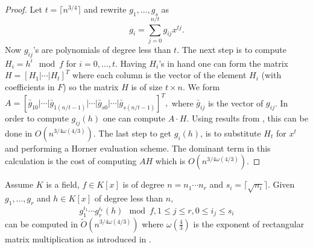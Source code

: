 \documentclass[sigconf]{acmart}
\newcommand{\osumcosttilde}{\tilde{O}(n^{3/4 \omega(4/3)})}
\theoremstyle{acmplain}
\begin{document}
\begin{proof}
Let $t = \lceil n^{3/4} \rceil$ and rewrite $g_1 , \ldots , g_s$ as 
$$g_i = \sum_{j= 0}^{n/t} g_{ij}x^{tj}.$$
Now $g_{ij}$'s are polynomials of degree less than $t$. The next step is to compute $H_i = h^i \mod f$ for $i = 0 , \ldots , t$.
Having $H_i$'s in hand one can form the matrix $H = \left[ H_1 \vert \cdots \vert H_t \right]^T$ where each column is the vector of 
the element $H_i$ (with coefficients in $F$) so the matrix $H$ is of size $t \times n$. We form 
$A = \left[\bar{g}_{10}\vert \cdots \vert \bar{g}_{1(n/t-1)}\vert \cdots \vert \bar{g}_{s0}\vert \cdots \vert \bar{g}_{s(n/t-1)}\right]^T,$
where $\bar{g}_{ij}$ is the  vector of $g_{ij}$. In order to compute $g_{ij}(h)$ one can compute $A \cdot H$. Using 
results from \cite{LeGall}, this can be done in $O(n^{3/4 \omega(4/3)})$. The last step to get $g_i(h)$, is to substitute $H_t$ 
for $x^t$ and performing a Horner evaluation scheme. The dominant term in this calculation is the cost of computing $AH$ which
is $O(n^{3/4 \omega(4/3)})$.
\end{proof}

\begin{lemma}\cite{Kaltofen}\label{lem:selfcomp}
Assume $K$ is a field, $f\in K[x]$ is of degree $n = n_1 \cdots n_r$ and $s_i = \lceil\sqrt{n_i}\rceil$. Given 
$g_1, \ldots , g_{r}$ and $h \in K[x]$ of degree less than $n$, $$g_1^{i_1}\cdots g_r^{i_r}(h) \mod f, 1 \leq j \leq r, 
0 \leq i_j \leq s_i$$ can be 
computed in $\osumcosttilde$ where $\omega(\frac{4}{3})$ is the exponent of rectangular matrix 
multiplication as introduced in \cite{LeGall}. 
\end{lemma}
\end{document}
